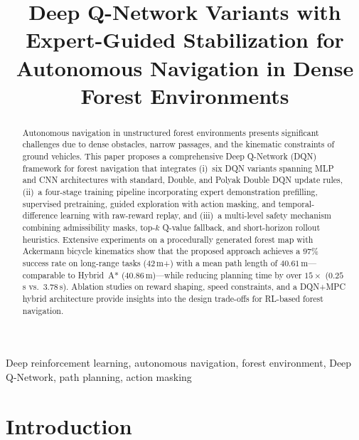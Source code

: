\documentclass[conference]{IEEEtran}
\begin{document}
\title{Deep Q-Network Variants with Expert-Guided Stabilization for Autonomous Navigation in Dense Forest Environments}

\author{
}

\maketitle

\begin{abstract}
Autonomous navigation in unstructured forest environments presents significant challenges due to dense obstacles, narrow passages, and the kinematic constraints of ground vehicles.
This paper proposes a comprehensive Deep Q-Network (DQN) framework for forest navigation that integrates
(i)~six DQN variants spanning MLP and CNN architectures with standard, Double, and Polyak Double DQN update rules,
(ii)~a four-stage training pipeline incorporating expert demonstration prefilling, supervised pretraining, guided exploration with action masking, and temporal-difference learning with raw-reward replay,
and (iii)~a multi-level safety mechanism combining admissibility masks, top-$k$ Q-value fallback, and short-horizon rollout heuristics.
Extensive experiments on a procedurally generated forest map with Ackermann bicycle kinematics show that the proposed approach achieves a $97\%$ success rate on long-range tasks ($42$\,m+) with a mean path length of $40.61$\,m---comparable to Hybrid~A* ($40.86$\,m)---while reducing planning time by over $15\times$ ($0.25$\,s vs.\ $3.78$\,s).
Ablation studies on reward shaping, speed constraints, and a DQN+MPC hybrid architecture provide insights into the design trade-offs for RL-based forest navigation.
\end{abstract}

\begin{IEEEkeywords}
Deep reinforcement learning, autonomous navigation, forest environment, Deep Q-Network, path planning, action masking
\end{IEEEkeywords}

\section{Introduction}\label{sec:intro}
\end{document}

